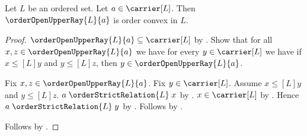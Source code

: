 \begin{proposition}\label{order_open_upper_ray_is_order_convex}
    Let $L$ be an ordered set.
    Let $a\in\carrier[L]$.
    Then $\orderOpenUpperRay{L}{a}$ is order convex in $L$.
\end{proposition}
\begin{proof}
    $\orderOpenUpperRay{L}{a}\subseteq\carrier[L]$ by
        .
    Show that for all $x,z\in\orderOpenUpperRay{L}{a}$ we have
        for every $y\in\carrier[L]$ we have if
            $x\mathrel{\leq[L]}y$ and $y\mathrel{\leq[L]}z$, then
            $y\in\orderOpenUpperRay{L}{a}$.
    \begin{subproof}
        Fix $x,z\in\orderOpenUpperRay{L}{a}$.
        Fix $y\in\carrier[L]$.
        Assume $x\mathrel{\leq[L]}y$ and $y\mathrel{\leq[L]}z$.
        $a\mathrel{\orderStrictRelation{L}}x$ by
            .
        $x\in\carrier[L]$ by .
        Hence $a\mathrel{\orderStrictRelation{L}}y$ by
            .
        Follows by .
    \end{subproof}
    Follows by .
\end{proof}
